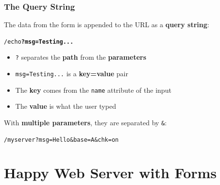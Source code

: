 \documentclass[xcolor=table]{beamer}
\begin{document}
\begin{frame}
\frametitle{The Query String}

The data from the form is appended to the URL as a \textbf{query string}:

\vspace{0.2cm}

\begin{center}
\texttt{/echo\textbf{?msg=Testing...}}
\end{center}

\vspace{0.2cm}

\begin{itemize}
\item \texttt{?} separates the \textbf{path} from the \textbf{parameters}
\item \texttt{msg=Testing...} is a \textbf{key=value} pair
\item The \textbf{key} comes from the \texttt{name} attribute of the input
\item The \textbf{value} is what the user typed
\end{itemize}

\vspace{0.3cm}

With \textbf{multiple parameters}, they are separated by \texttt{\&}:

\vspace{0.1cm}

\begin{center}
\texttt{/myserver?msg=Hello\&base=A\&chk=on}
\end{center}

\end{frame}


\section{Happy Web Server with Forms}
\end{document}
